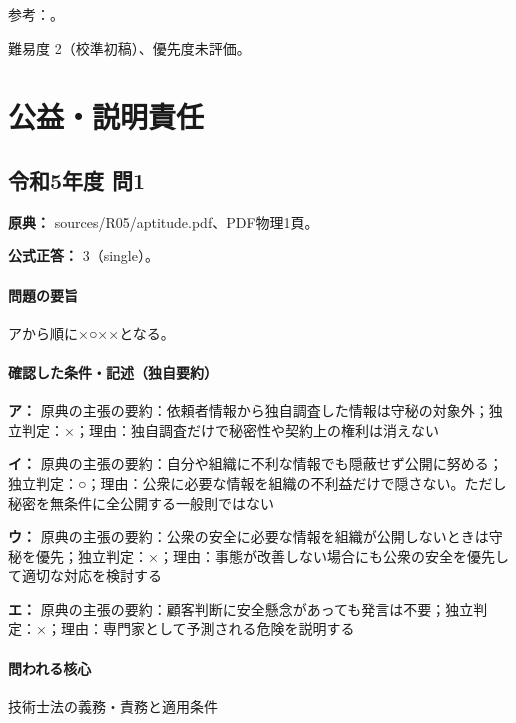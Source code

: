 \par 参考：\cite{engineer_act_current}。

\par 難易度 2（校準初稿）、優先度未評価。

\section{公益・説明責任}

\subsection{令和5年度 問1}
\label{q:r05-reg-apt-01}

\noindent\textbf{原典：} sources/R05/aptitude.pdf、PDF物理1頁。

\textbf{公式正答：} 3（single）。

\paragraph{問題の要旨} アから順に×○××となる。

\paragraph{確認した条件・記述（独自要約）}\mbox{}\par

\noindent\textbf{ア：} 原典の主張の要約：依頼者情報から独自調査した情報は守秘の対象外；独立判定：×；理由：独自調査だけで秘密性や契約上の権利は消えない\par

\noindent\textbf{イ：} 原典の主張の要約：自分や組織に不利な情報でも隠蔽せず公開に努める；独立判定：○；理由：公衆に必要な情報を組織の不利益だけで隠さない。ただし秘密を無条件に全公開する一般則ではない\par

\noindent\textbf{ウ：} 原典の主張の要約：公衆の安全に必要な情報を組織が公開しないときは守秘を優先；独立判定：×；理由：事態が改善しない場合にも公衆の安全を優先して適切な対応を検討する\par

\noindent\textbf{エ：} 原典の主張の要約：顧客判断に安全懸念があっても発言は不要；独立判定：×；理由：専門家として予測される危険を説明する\par

\paragraph{問われる核心} 技術士法の義務・責務と適用条件

